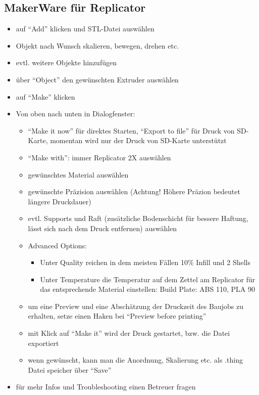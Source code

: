\documentclass{\basedir/fablab-document}
\begin{document}
\subsection{MakerWare für Replicator}
\begin{itemize}
	\item auf ``Add'' klicken und STL-Datei auswählen
	\item Objekt nach Wunsch skalieren, bewegen, drehen etc.
	\item evtl. weitere Objekte hinzufügen
	\item über ``Object'' den gewünschten Extruder auswählen
	\item auf ``Make'' klicken
	\item Von oben nach unten in Dialogfenster:
	\begin{itemize}
		\item ``Make it now'' für direktes Starten, ``Export to file'' für Druck von SD-Karte, momentan wird nur der Druck von SD-Karte unterstützt
		\item ``Make with'': immer Replicator 2X auswählen
		\item gewünschtes Material auswählen
		\item gewünschte Präzision auswählen (Achtung! Höhere Präzion bedeutet längere Druckdauer)
		\item evtl. Supports und Raft (zusätzliche Bodenschicht für bessere Haftung, lässt sich nach dem Druck entfernen) auswählen
		\item Advanced Options:
		\begin{itemize}
			\item Unter Quality reichen in dem meisten Fällen 10\% Infill und 2 Shells
			\item Unter Temperature die Temperatur auf dem Zettel am Replicator für das entsprechende Material einstellen:
			Build Plate: ABS 110\textcelsius{}, PLA 90\textcelsius{}
		\end{itemize}
		\item um eine Preview und eine Abschätzung der Druckzeit des Baujobs zu erhalten, setze einen Haken bei ``Preview before printing''
		\item mit Klick auf ``Make it'' wird der Druck gestartet, bzw. die Datei exportiert
		\item wenn gewünscht, kann man die Anordnung, Skalierung etc. als .thing Datei speicher über ``Save''
	\end{itemize}
	\item für mehr Infos und Troubleshooting einen Betreuer fragen
\end{itemize}
\end{document}
